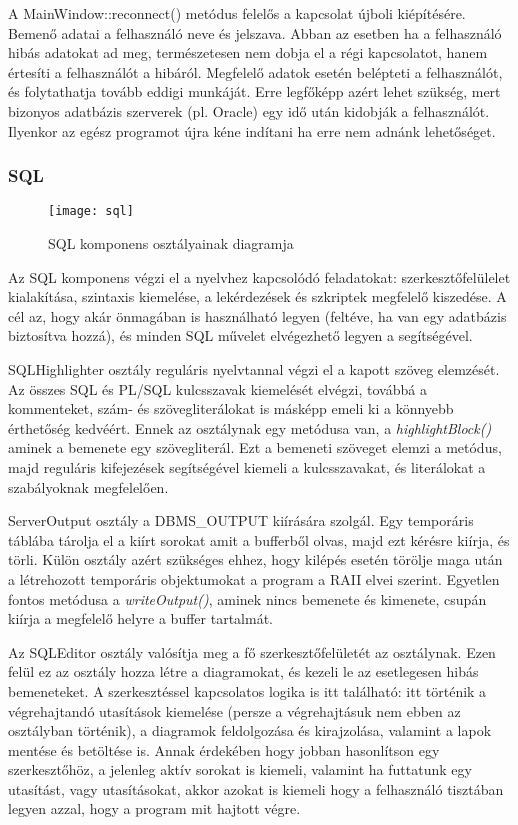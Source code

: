 A MainWindow::reconnect() metódus felelős a kapcsolat újboli kiépítésére. Bemenő adatai a felhasználó neve és jelszava. Abban az esetben ha a felhasználó
hibás adatokat ad meg, természetesen nem dobja el a régi kapcsolatot, hanem értesíti a felhasználót a hibáról. Megfelelő adatok esetén belépteti a felhasználót,
és folytathatja tovább eddigi munkáját. Erre legfőképp azért lehet szükség, mert bizonyos adatbázis szerverek (pl. Oracle) egy idő után kidobják a felhasználót.
Ilyenkor az egész programot újra kéne indítani ha erre nem adnánk lehetőséget.

\subsubsection{SQL}

\begin{figure}[ht]
  \begin{center}
  \texttt{[image: sql]}
  \end{center}
 \caption{SQL komponens osztályainak diagramja}
\end{figure}

Az SQL komponens végzi el a nyelvhez kapcsolódó feladatokat: szerkesztőfelülelet kialakítása, szintaxis kiemelése, a lekérdezések és szkriptek
megfelelő kiszedése. A cél az, hogy akár önmagában is használható legyen (feltéve, ha van egy adatbázis biztosítva hozzá), és minden SQL művelet
elvégezhető legyen a segítségével.

SQLHighlighter osztály reguláris nyelvtannal végzi el a kapott szöveg elemzését. Az összes SQL és PL/SQL kulcsszavak\cite{sqlwords} kiemelését
elvégzi, továbbá a kommenteket, szám- és szövegliterálokat is másképp emeli ki a könnyebb érthetőség kedvéért.
Ennek az osztálynak egy metódusa van, a \textit{highlightBlock()} aminek a bemenete egy szövegliterál. Ezt a bemeneti szöveget elemzi a metódus,
majd reguláris kifejezések segítségével kiemeli a kulcsszavakat, és literálokat a szabályoknak megfelelően.

ServerOutput osztály a DBMS\_OUTPUT kiírására szolgál. Egy temporáris táblába tárolja el a kiírt sorokat amit a bufferből olvas, majd ezt kérésre
kiírja, és törli. Külön osztály azért szükséges ehhez, hogy kilépés esetén törölje maga után a létrehozott temporáris objektumokat a program a
RAII elvei szerint. Egyetlen fontos metódusa a \textit{writeOutput()}, aminek nincs bemenete és kimenete, csupán kiírja a megfelelő helyre a
buffer tartalmát.

Az SQLEditor osztály valósítja meg a fő szerkesztőfelületét az osztálynak. Ezen felül ez az osztály hozza létre a diagramokat, és kezeli le az
esetlegesen hibás bemeneteket. A szerkesztéssel kapcsolatos logika is itt található: itt történik a végrehajtandó utasítások kiemelése (persze a
végrehajtásuk nem ebben az osztályban történik), a diagramok feldolgozása és kirajzolása, valamint a lapok mentése és betöltése is. Annak érdekében
hogy jobban hasonlítson egy szerkesztőhöz, a jelenleg aktív sorokat is kiemeli, valamint ha futtatunk egy utasítást, vagy utasításokat, akkor azokat
is kiemeli hogy a felhasználó tisztában legyen azzal, hogy a program mit hajtott végre.

